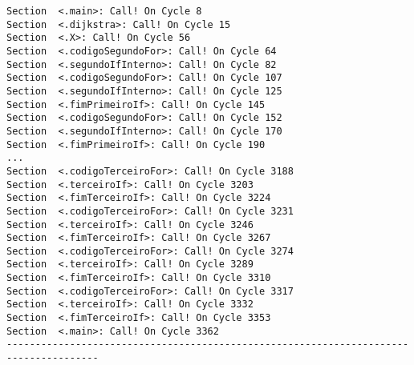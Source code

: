 \begin{verbatim}
Section  <.main>: Call! On Cycle 8 
Section  <.dijkstra>: Call! On Cycle 15 
Section  <.X>: Call! On Cycle 56 
Section  <.codigoSegundoFor>: Call! On Cycle 64 
Section  <.segundoIfInterno>: Call! On Cycle 82 
Section  <.codigoSegundoFor>: Call! On Cycle 107
Section  <.segundoIfInterno>: Call! On Cycle 125 
Section  <.fimPrimeiroIf>: Call! On Cycle 145 
Section  <.codigoSegundoFor>: Call! On Cycle 152 
Section  <.segundoIfInterno>: Call! On Cycle 170 
Section  <.fimPrimeiroIf>: Call! On Cycle 190 
...
Section  <.codigoTerceiroFor>: Call! On Cycle 3188 
Section  <.terceiroIf>: Call! On Cycle 3203 
Section  <.fimTerceiroIf>: Call! On Cycle 3224
Section  <.codigoTerceiroFor>: Call! On Cycle 3231
Section  <.terceiroIf>: Call! On Cycle 3246 
Section  <.fimTerceiroIf>: Call! On Cycle 3267 
Section  <.codigoTerceiroFor>: Call! On Cycle 3274 
Section  <.terceiroIf>: Call! On Cycle 3289 
Section  <.fimTerceiroIf>: Call! On Cycle 3310 
Section  <.codigoTerceiroFor>: Call! On Cycle 3317
Section  <.terceiroIf>: Call! On Cycle 3332 
Section  <.fimTerceiroIf>: Call! On Cycle 3353 
Section  <.main>: Call! On Cycle 3362 
--------------------------------------------------------------------------------------
\end{verbatim}

